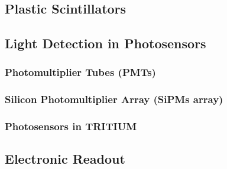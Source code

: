 \documentclass[12pt,a4paper]{book}
\begin{document}
		\subsection{Plastic Scintillators} \label{subsec:PlasticScintillators}
		
		
			
		\subsection{Light Detection in Photosensors}\label{subsec:Photosensors}
		
	
			\subsubsection{Photomultiplier Tubes (PMTs)}\label{subsubsec:PMTs}
			
		
			\subsubsection{Silicon Photomultiplier Array (SiPMs array)}\label{subsubsec:SiPM}
			
			
			\subsubsection{Photosensors in TRITIUM}\label{subsubsec:ComparisonPhotosensors}
			
					
		\subsection{Electronic Readout}\label{subsec:IntroductionElectronicalSystem}
			
	
\end{document}
